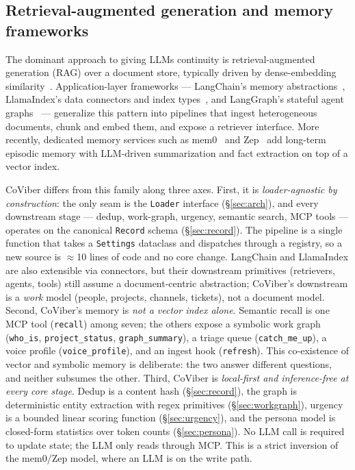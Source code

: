 \subsection{Retrieval-augmented generation and memory frameworks}
\label{sec:related:rag}

The dominant approach to giving LLMs continuity is retrieval-augmented generation (RAG) over a document store, typically driven by dense-embedding similarity~\cite{TODO-rag-lewis-2020,TODO-dense-passage-retrieval}. Application-layer frameworks --- LangChain's memory abstractions~\cite{TODO-langchain-memory}, LlamaIndex's data connectors and index types~\cite{TODO-llamaindex}, and LangGraph's stateful agent graphs~\cite{TODO-langgraph} --- generalize this pattern into pipelines that ingest heterogeneous documents, chunk and embed them, and expose a retriever interface. More recently, dedicated memory services such as mem0~\cite{TODO-mem0} and Zep~\cite{TODO-zep} add long-term episodic memory with LLM-driven summarization and fact extraction on top of a vector index.

CoViber differs from this family along three axes. First, it is \emph{loader-agnostic by construction}: the only seam is the \texttt{Loader} interface (\S\ref{sec:arch}), and every downstream stage --- dedup, work-graph, urgency, semantic search, MCP tools --- operates on the canonical \texttt{Record} schema (\S\ref{sec:record}). The pipeline is a single function that takes a \texttt{Settings} dataclass and dispatches through a registry, so a new source is $\approx$10 lines of code and no core change. LangChain and LlamaIndex are also extensible via connectors, but their downstream primitives (retrievers, agents, tools) still assume a document-centric abstraction; CoViber's downstream is a \emph{work} model (people, projects, channels, tickets), not a document model. Second, CoViber's memory is \emph{not a vector index alone}. Semantic recall is one MCP tool (\texttt{recall}) among seven; the others expose a symbolic work graph (\texttt{who\_is}, \texttt{project\_status}, \texttt{graph\_summary}), a triage queue (\texttt{catch\_me\_up}), a voice profile (\texttt{voice\_profile}), and an ingest hook (\texttt{refresh}). This co-existence of vector and symbolic memory is deliberate: the two answer different questions, and neither subsumes the other. Third, CoViber is \emph{local-first and inference-free at every core stage}. Dedup is a content hash (\S\ref{sec:record}), the graph is deterministic entity extraction with regex primitives (\S\ref{sec:workgraph}), urgency is a bounded linear scoring function (\S\ref{sec:urgency}), and the persona model is closed-form statistics over token counts (\S\ref{sec:persona}). No LLM call is required to update state; the LLM only reads through MCP. This is a strict inversion of the mem0/Zep model, where an LLM is on the write path.

